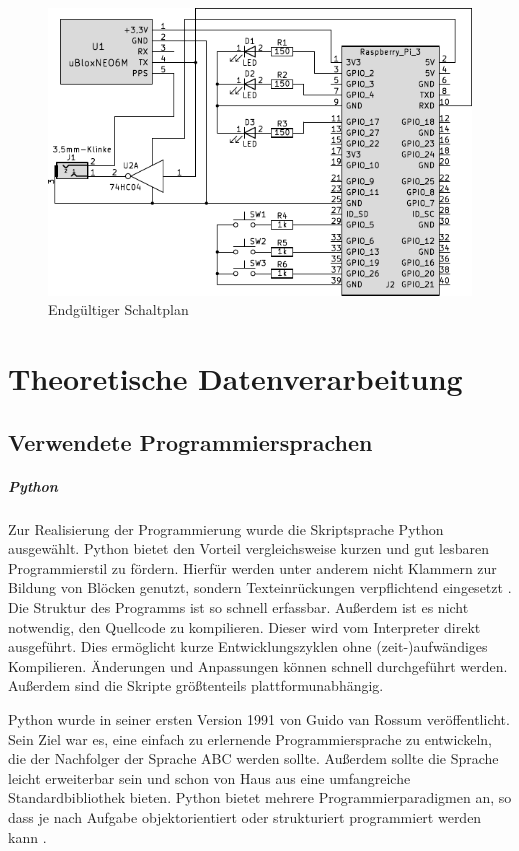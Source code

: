 \documentclass[a4paper,12pt,bibliography=totoc, listof=totoc,titlepage,pointlessnumbers]{scrreprt}
\begin{document}
\begin{figure}
 \centering
 \includegraphics[width=1\textwidth]{img/schaltplanGesamt.pdf}
 \caption{Endgültiger Schaltplan}
 \label{abb:gesamtschaltung}
\end{figure}

\chapter{Theoretische Datenverarbeitung}
\label{c:datenverarbeitung}

\section{Verwendete Programmiersprachen}
\paragraph{Python}
Zur Realisierung der Programmierung wurde die Skriptsprache Python ausgewählt. Python bietet den Vorteil vergleichsweise kurzen und gut lesbaren Programmierstil zu fördern. Hierfür werden unter anderem nicht Klammern zur Bildung von Blöcken genutzt, sondern Texteinrückungen verpflichtend eingesetzt \citep[S. 13f]{python}. Die Struktur des Programms ist so schnell erfassbar. Außerdem ist es nicht notwendig, den Quellcode zu kompilieren. Dieser wird vom Interpreter direkt ausgeführt. Dies ermöglicht kurze Entwicklungszyklen ohne (zeit-)aufwändiges Kompilieren. Änderungen und Anpassungen können schnell durchgeführt werden. Außerdem sind die Skripte größtenteils plattformunabhängig.

Python wurde in seiner ersten Version 1991 von Guido van Rossum veröffentlicht. Sein Ziel war es, eine einfach zu erlernende Programmiersprache zu entwickeln, die der Nachfolger der Sprache ABC werden sollte. Außerdem sollte die Sprache leicht erweiterbar sein und schon von Haus aus eine umfangreiche Standardbibliothek bieten. Python bietet mehrere Programmierparadigmen an, so dass je nach Aufgabe objektorientiert oder strukturiert programmiert werden kann \citep[S. 14]{python}.
\end{document}
